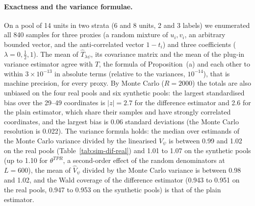 \paragraph{Exactness and the variance formulae.} On a pool of 14 units in two strata (6 and 8 units, 2 and 3 labels) we enumerated all 840 samples for three proxies (a random mixture of $u_i,v_i$, an arbitrary bounded vector, and
the anti-correlated vector $1-t_i$) and three coefficients ($\lambda=0,\frac12,1$). The mean of $\hat T_{\lambda\psi}$, its covariance matrix and the mean of the plug-in variance estimator agree with $T$,
the formula of Proposition~(a) and each other to within $3\times10^{-13}$ in absolute terms (relative to the variances, $10^{-14}$), that is machine precision, for every proxy. By Monte Carlo ($R=2000$) the totals are also unbiased on the four real pools and six synthetic pools: the largest standardised bias
over the 29--49 coordinates is $|z|=2.7$ for the difference estimator and 2.6 for the plain estimator, which share their samples and have strongly correlated coordinates, and the largest bias is 0.06 standard deviations
(the Monte Carlo resolution is 0.022). The variance formula holds: the median over estimands of the Monte Carlo variance divided by the linearised $V_\psi$ is between 0.99 and 1.02 on the real pools (Table~\ref{tab:sim-dif-real}) and 1.01 to 1.07 on the synthetic
pools (up to 1.10 for $\theta^{TPR}$, a second-order effect of the random denominators at $L=600$), the mean of $\hat V_\psi$ divided by the Monte Carlo variance is between 0.98 and 1.02, and the Wald coverage of the difference estimator
(0.943 to 0.951 on the real pools, 0.947 to 0.953 on the synthetic pools) is that of the plain estimator.

